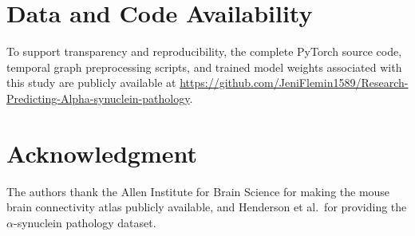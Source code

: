 \documentclass[conference]{IEEEtran}
\begin{document}
\section*{Data and Code Availability}
To support transparency and reproducibility, the complete PyTorch source code, temporal graph preprocessing scripts, and trained model weights associated with this study are publicly available at \url{https://github.com/JeniFlemin1589/Research-Predicting-Alpha-synuclein-pathology}.

\section*{Acknowledgment}
The authors thank the Allen Institute for Brain Science for making the mouse brain connectivity atlas publicly available, and Henderson et al.\ for providing the $\alpha$-synuclein pathology dataset.

\balance


\end{document}
